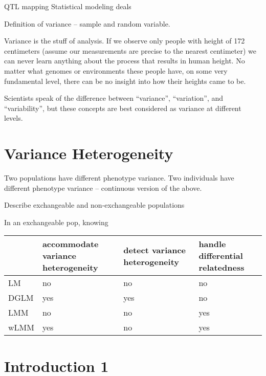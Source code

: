 QTL mapping Statistical modeling deals 

Definition of variance -- sample and random variable.

Variance is the stuff of analysis.
If we observe only people with height of 172 centimeters (assume our measurements are precise to the nearest centimeter) we can never learn anything about the process that results in human height.
No matter what genomes or environments these people have, on some very fundamental level, there can be no insight into how their heights came to be.

Scientists speak of the difference between ``variance'', ``variation'', and ``variability'', but these concepts are best considered as variance at different levels.

\section{Variance Heterogeneity}

Two populations have different phenotype variance.
Two individuals have different phenotype variance -- continuous version of the above.

Describe exchangeable and non-exchangeable populations

In an exchangeable pop, knowing 

\begin{table}[ht]
	\begin{tabular}{lp{1in}p{1in}p{1in}}
		\toprule
				& accommodate variance heterogeneity & detect variance heterogeneity & handle differential relatedness\\
		\midrule
		LM 		& no	& no	& no\\
		DGLM 	& yes 	& yes 	& no\\
		LMM  	& no 	& no	& yes\\
		wLMM	& yes	& no	& yes\\
		\bottomrule
	\end{tabular}
\end{table}

\section{Introduction 1}

